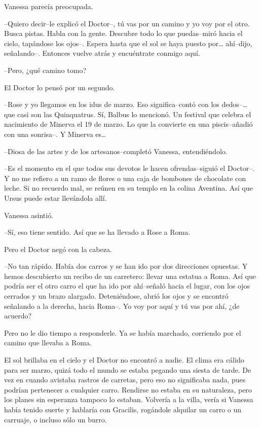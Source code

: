 Vanessa parecía preocupada.

--Quiero decir--le explicó el Doctor--, tú vas por un camino y yo voy
por el otro. Busca pistas. Habla con la gente. Descubre todo lo que
puedas--miró hacia el cielo, tapándose los ojos--. Espera hasta que el
sol se haya puesto por\ldots{} ahí--dijo, señalando--. Entonces vuelve
atrás y encuéntrate conmigo aquí.

--Pero, ¿qué camino tomo?

El Doctor lo pensó por un segundo.

--Rose y yo llegamos en los idus de marzo. Eso significa--contó con los
dedos--\ldots{} que casi son las Quinquatrus. Sí, Balbus lo mencionó. Un
festival que celebra el nacimiento de Minerva el 19 de marzo. Lo que la
convierte en una piscis--añadió con una sonrisa--. Y Minerva es\ldots{}

--Diosa de las artes y de los artesanos--completó Vanessa,
entendiéndolo.

--Es el momento en el que todos sus devotos le hacen ofrendas--siguió el
Doctor--. Y no me refiero a un ramo de flores o una caja de bombones de
chocolate con leche. Si no recuerdo mal, se reúnen en su templo en la
colina Aventina. Así que Ursus puede estar llevándola allí.

Vanessa asintió.

--Sí, eso tiene sentido. Así que se ha llevado a Rose a Roma.

Pero el Doctor negó con la cabeza.

--No tan rápido. Había dos carros y se han ido por dos direcciones
opuestas. Y hemos descubierto un recibo de un carretero: llevar una
estatua a Roma. Así que podría ser el otro carro el que ha ido por
ahí--señaló hacia el lugar, con los ojos cerrados y un brazo alargado.
Deteniéndose, abrió los ojos y se encontró señalando a la derecha, hacia
Roma--. Yo voy por aquí y tú vas por ahí, ¿de acuerdo?

Pero no le dio tiempo a responderle. Ya se había marchado, corriendo por
el camino que llevaba a Roma.

El sol brillaba en el cielo y el Doctor no encontró a nadie. El clima
era cálido para ser marzo, quizá todo el mundo se estaba pegando una
siesta de tarde. De vez en cuando avistaba rastros de carretas, pero eso
no significaba nada, pues podrían pertenecer a cualquier carro. Rendirse
no estaba en su naturaleza, pero los planes sin esperanza tampoco lo
estaban. Volvería a la villa, vería si Vanessa había tenido suerte y
hablaría con Gracilis, rogándole alquilar un carro o un carruaje, o
incluso sólo un burro.

